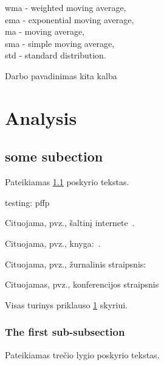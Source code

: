 \documentclass[a4paper,12pt,fleqn]{article}
\begin{document}

\tableofcontents


{wma - weighted moving average,\\
ema - exponential moving average,\\
ma - moving average,\\
sma - simple moving average,\\
std - standard distribution.\\
}

\bothabstracts{}%
{Darbo pavadinimas kita kalba} %
{}%






\newpage
\section{Analysis}\label{sec:motivation}

\subsection{some subection}\label{sec:example}
Pateikiamas \ref{sec:example} poskyrio tekstas. 

testing: pffp

Cituojama, pvz., šaltinį internete~\cite{KTZ}.

Cituojama, pvz., knyga:~\cite{bdkkmt2012}.

Cituojama, pvz., žurnalinis straipsnis:~\cite{Brilingaite201821}

Cituojamas, pvz., konferencijos straipsnis~\cite{BRILINGAITE2017APP}

Visas turinys priklauso \ref{sec:motivation} skyriui.
 
\subsubsection{The first sub-subsection}\label{sec:data}
Pateikiamas trečio lygio poskyrio tekstas.
\end{document}
